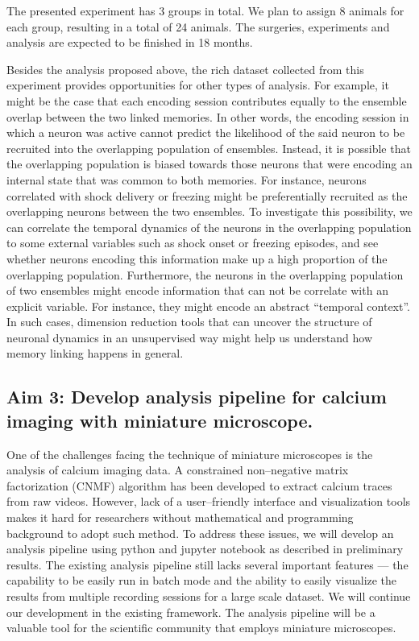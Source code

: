 \documentclass[master.tex]{subfiles}
\begin{document}
The presented experiment has 3 groups in total. We plan to assign 8 animals for
each group, resulting in a total of 24 animals. The surgeries, experiments and
analysis are expected to be finished in 18 months.

Besides the analysis proposed above, the rich dataset collected from this
experiment provides opportunities for other types of analysis. For example, it
might be the case that each encoding session contributes equally to the ensemble
overlap between the two linked memories. In other words, the encoding session in
which a neuron was active cannot predict the likelihood of the said neuron to be
recruited into the overlapping population of ensembles. Instead, it is possible
that the overlapping population is biased towards those neurons that were
encoding an internal state that was common to both memories. For instance,
neurons correlated with shock delivery or freezing might be preferentially
recruited as the overlapping neurons between the two ensembles. To investigate
this possibility, we can correlate the temporal dynamics of the neurons in the
overlapping population to some external variables such as shock onset or
freezing episodes, and see whether neurons encoding this information make up a
high proportion of the overlapping population. Furthermore, the neurons in the
overlapping population of two ensembles might encode information that can not be
correlate with an explicit variable. For instance, they might encode an abstract
``temporal context''. In such cases, dimension reduction tools that can uncover
the structure of neuronal dynamics in an unsupervised way might help us
understand how memory linking happens in general.

\subsection*{Aim 3: Develop analysis pipeline for calcium imaging with miniature
  microscope.}

One of the challenges facing the technique of miniature microscopes is the
analysis of calcium imaging data. A constrained non--negative matrix
factorization (CNMF) algorithm has been developed to extract calcium traces from
raw videos. However, lack of a user--friendly interface and visualization tools
makes it hard for researchers without mathematical and programming background to
adopt such method. To address these issues, we will develop an analysis pipeline
using python and jupyter notebook as described in preliminary results. The
existing analysis pipeline still lacks several important features --- the
capability to be easily run in batch mode and the ability to easily visualize
the results from multiple recording sessions for a large scale dataset. We will
continue our development in the existing framework. The analysis pipeline will
be a valuable tool for the scientific community that employs miniature
microscopes.
\end{document}
